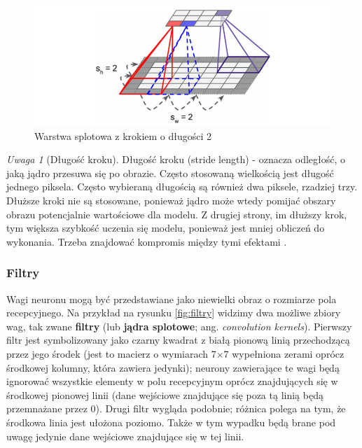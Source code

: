 \documentclass[12pt]{mwbk}
\theoremstyle{plain}
\theoremstyle{definition}
\theoremstyle{remark}
\newtheorem{uwaga}{Uwaga}[chapter]
\newcommand\zrodlo[1]{\par\vspace{-3mm}{\small\textit{Źródło: }#1 }}
\begin{document}
\begin{figure}[!h]
	\centering
	\includegraphics[width=0.9\linewidth]{rys/cnn_stride.png}
	\caption{Warstwa splotowa z krokiem o długości 2}
	\zrodlo{\cite{geron}}
	\label{fig:stride}
\end{figure}

\begin{uwaga}[Długość kroku]
	Długość kroku (stride length) - oznacza odległość, o jaką jądro przesuwa się po obrazie. Często stosowaną wielkością jest długość jednego piksela. Często wybieraną długością są również dwa piksele, rzadziej trzy. Dłuższe kroki nie są stosowane, ponieważ jądro może wtedy pomijać obszary obrazu potencjalnie wartościowe dla modelu. Z drugiej strony, im dłuższy krok, tym większa szybkość uczenia się modelu, ponieważ jest mniej obliczeń do wykonania. Trzeba znajdować kompromis między tymi efektami \cite{illustrated}.
\end{uwaga}

\subsubsection{Filtry}

Wagi neuronu mogą być przedstawiane jako niewielki obraz o rozmiarze pola recepcyjnego. Na
przykład na rysunku \ref{fig:filtry} widzimy dwa możliwe zbiory wag, tak zwane \textbf{filtry} (lub \textbf{jądra splotowe}; ang. \emph{convolution kernels}). Pierwszy filtr jest symbolizowany jako czarny kwadrat z białą pionową
linią przechodzącą przez jego środek (jest to macierz o wymiarach 7×7 wypełniona zerami oprócz
środkowej kolumny, która zawiera jedynki); neurony zawierające te wagi będą ignorować wszystkie
elementy w polu recepcyjnym oprócz znajdujących się w środkowej pionowej linii (dane wejściowe
znajdujące się poza tą linią będą przemnażane przez 0). Drugi filtr wygląda podobnie; różnica
polega na tym, że środkowa linia jest ułożona poziomo. Także w tym wypadku będą brane pod uwagę
jedynie dane wejściowe znajdujące się w tej linii.
\end{document}

